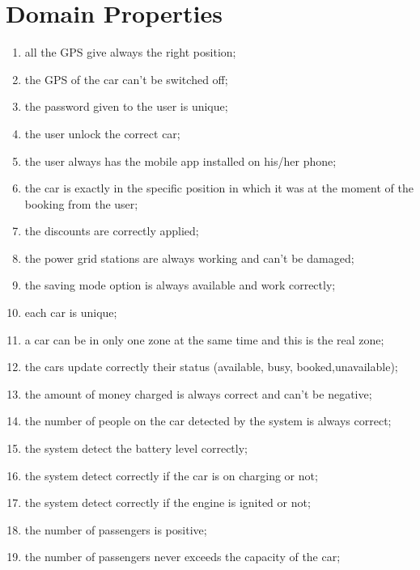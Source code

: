 \section{Domain Properties}
\begin{enumerate}
	\item all the GPS give always the right position;
	\item the GPS of the car can't be switched off;
	\item the password given to the user is unique;
	\item the user unlock the correct car;
	\item the user always has the mobile app installed on his/her phone;
	\item the car is exactly in the specific position in which it was at the moment of the booking from the user;
	\item the discounts are correctly applied;
	\item the power grid stations are always working and can't be damaged;
	\item the saving mode option is always available and work correctly;
	\item each car is unique;
	\item a car can be in only one zone at the same time and this is the real zone;
	\item the cars update correctly their status (available, busy, booked,unavailable);
    \item the amount of money charged is always correct and can't be negative;
    \item the number of people on the car detected by the system is always correct;
    \item the system detect the battery level correctly;
    \item the system detect correctly if the car is on charging or not;
    \item the system detect correctly if the engine is ignited or not;
    \item the number of passengers is positive;
    \item the number of passengers never exceeds the capacity of the car;

    
  
   
    
\end{enumerate}
